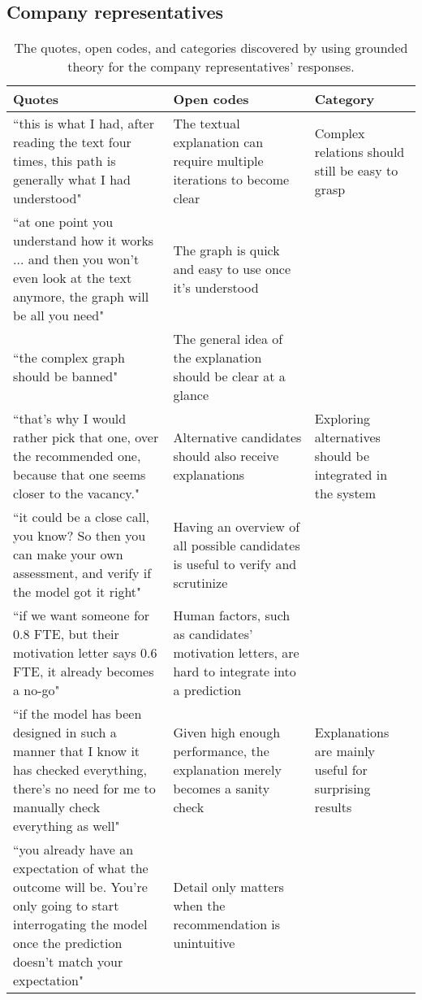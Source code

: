 \subsection{Company representatives}
\begin{table*}[]
\captionsetup{width=1.5\textwidth}
\footnotesize
\begin{adjustwidth}{-2.5in}{-2.5in}
\centering
\begin{tabularx}{1.5\textwidth}{@{}X>{\raggedright\arraybackslash}p{6.5cm}>{\raggedright\arraybackslash}p{3.5cm}@{}}

\toprule
\textbf{Quotes} &
  \textbf{Open codes} &
  \textbf{Category} \\ \midrule
``this is what I had, after reading the text four times, this path is generally what I had understood" &
  The textual explanation can require multiple iterations to become clear &
  Complex relations should still be easy to grasp \\ \cmidrule(r){1-1}
``at one point you understand how it works ... and then you won't even look at the text anymore, the graph will be all you need" &
  The graph is quick and easy to use once it's understood &
   \\ \cmidrule(r){1-1}
``the complex graph should be banned" &
  The general idea of the explanation should be clear at a glance &
   \\ \midrule
``that's why I would rather pick that one, over the recommended one, because that one seems closer to the vacancy." &
  Alternative candidates should also receive explanations &
  Exploring alternatives should be integrated in the system \\ \cmidrule(r){1-1}
``it could be a close call, you know? So then you can make your own assessment, and verify if the model got it right" &
  Having an overview of all possible candidates is useful to verify and scrutinize &
   \\ \cmidrule(r){1-1}
``if we want someone for 0.8 FTE, but their motivation letter says 0.6 FTE, it already becomes a no-go" &
  Human factors, such as candidates' motivation letters, are hard to integrate into a prediction &
   \\ \midrule
``if the model has been designed in such a manner that I know it has checked everything, there's no need for me to manually check everything as well" &
  Given high enough performance, the explanation merely becomes a sanity check &
  Explanations are mainly useful for surprising results \\ \cmidrule(r){1-1}
``you already have an expectation of what the outcome will be. You're only going to start interrogating the model once the prediction doesn't match your expectation" &
  Detail only matters when the recommendation is unintuitive &
   \\ \bottomrule
   
\end{tabularx}
\end{adjustwidth}
\caption{The quotes, open codes, and categories discovered by using grounded theory for the company representatives' responses.}
\label{tab:companies_GT}   
\end{table*}

